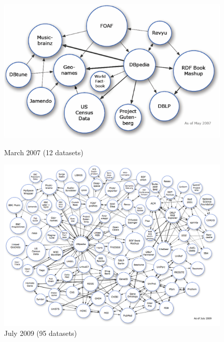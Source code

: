\begin{figure}
\centering
{}
\begin{minipage}{.5\textwidth}
  \centering
  \includegraphics[width=\linewidth]{Figures/LOD/lod-cloud_2007.png}
  \caption*{March 2007 (12 datasets)}
  \label{fig:test1}
\end{minipage}%
\begin{minipage}{.5\textwidth}
  \centering
  \includegraphics[width=\linewidth]{Figures/LOD/lod-cloud_2009.png}
  \caption*{July 2009 (95 datasets)}
  \label{fig:test2}
\end{minipage}
\end{figure}
\vspace{5cm}
